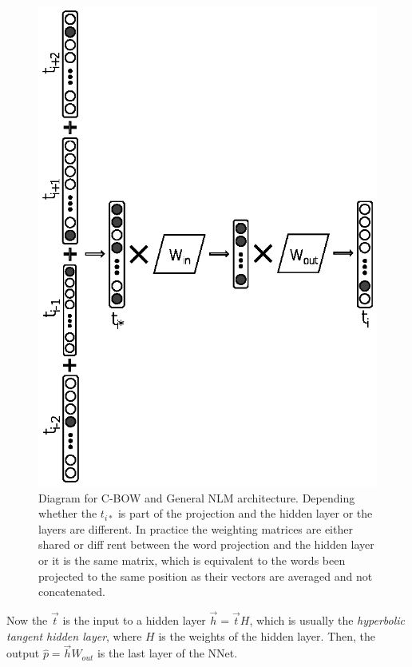 \begin{figure}[t]
	\begin{center}
    	\includegraphics[scale=0.99]{Figures/CBOW_diagram.eps}
		\caption{Diagram for C-BOW and General NLM architecture. Depending whether the $t_{i*}$ is part of the projection and the hidden layer or the layers are different. In practice the weighting matrices are either shared or diff rent between the word projection and the hidden layer or it is the same matrix, which is equivalent to the words been projected to the same position as their vectors are averaged and not concatenated.}
		\label{chap:word_embeddingss:fig:CBOW_diagram}
	\end{center}
\end{figure}

Now the $\vec{t}$ is the input to a hidden layer $\vec{h}=\vec{t}H$, which is usually the \textit{hyperbolic tangent hidden layer}, where $H$ is the weights of the hidden layer. Then, the output $\hat{p}=\vec{h}W_{out}$ is the last layer of the NNet.

